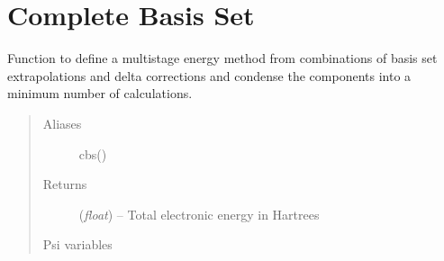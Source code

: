 \documentclass[letterpaper,10pt,english]{sphinxmanual}
\begin{document}
\chapter{Complete Basis Set}
\label{index:complete-basis-set}

\begin{fulllineitems}
\label{index:wrappers.complete_basis_set}
Function to define a multistage energy method from combinations of
basis set extrapolations and delta corrections and condense the
components into a minimum number of calculations.
\begin{quote}\begin{description}
\item[{Aliases }] \leavevmode
cbs()

\item[{Returns}] \leavevmode
(\emph{float}) -- Total electronic energy in Hartrees

\item[{Psi variables}] \leavevmode
\end{description}\end{quote}

\begin{fulllineitems}
\label{index:envvar-CBSTOTALENERGY}\label{index:envvar-CBSREFERENCEENERGY}\label{index:envvar-CBSCORRELATIONENERGY}\label{index:envvar-CURRENTENERGY}\label{index:envvar-CURRENTREFERENCEENERGY}\label{index:envvar-CURRENTCORRELATIONENERGY}
\end{fulllineitems}



\end{fulllineitems}
\end{document}
